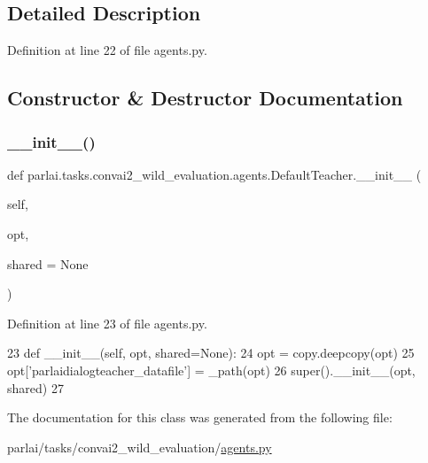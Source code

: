 \subsection{Detailed Description}


Definition at line 22 of file agents.\+py.



\subsection{Constructor \& Destructor Documentation}
\mbox{\label{classparlai_1_1tasks_1_1convai2__wild__evaluation_1_1agents_1_1DefaultTeacher_a0952cee2a6035fb39bfba3ad0c04b8c3}} 
\subsubsection{\texorpdfstring{\+\_\+\+\_\+init\+\_\+\+\_\+()}{\_\_init\_\_()}}
{\footnotesize\ttfamily def parlai.\+tasks.\+convai2\+\_\+wild\+\_\+evaluation.\+agents.\+Default\+Teacher.\+\_\+\+\_\+init\+\_\+\+\_\+ (\begin{DoxyParamCaption}\item[{}]{self,  }\item[{}]{opt,  }\item[{}]{shared = {\ttfamily None} }\end{DoxyParamCaption})}



Definition at line 23 of file agents.\+py.


\begin{DoxyCode}
23     \textcolor{keyword}{def }\_\_init\_\_(self, opt, shared=None):
24         opt = copy.deepcopy(opt)
25         opt[\textcolor{stringliteral}{'parlaidialogteacher\_datafile'}] = \_path(opt)
26         super().\_\_init\_\_(opt, shared)
27 \end{DoxyCode}


The documentation for this class was generated from the following file\+:\begin{DoxyCompactItemize}
\item 
parlai/tasks/convai2\+\_\+wild\+\_\+evaluation/\hyperlink{parlai_2tasks_2convai2__wild__evaluation_2agents_8py}{agents.\+py}\end{DoxyCompactItemize}
